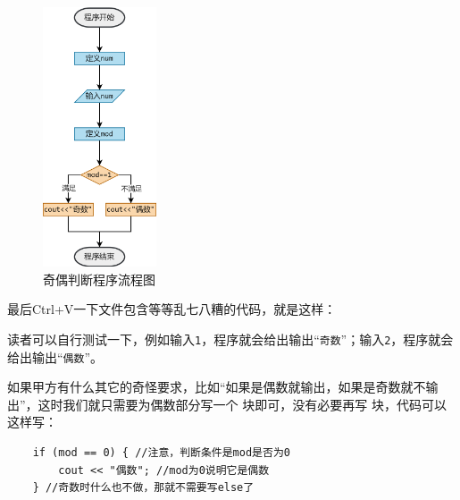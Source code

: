 \begin{figure}[htbp]
    \centering
    \includegraphics[width=0.3\textwidth]{../images/generalized_parts/03_structure_of_odd_or_even.drawio.png}
    \caption{奇偶判断程序流程图}
\end{figure}\pagebreak
最后Ctrl+V一下文件包含等等乱七八糟的代码，就是这样：

读者可以自行测试一下，例如输入\texttt{1}，程序就会给出输出``\texttt{奇数}''；输入\texttt{2}，程序就会给出输出``\texttt{偶数}''。\par
如果甲方有什么其它的奇怪要求，比如``如果是偶数就输出，如果是奇数就不输出''，这时我们就只需要为偶数部分写一个 \lstinline@if@ 块即可，没有必要再写 \lstinline@else@ 块，代码可以这样写：\pagebreak
\begin{lstlisting}
    if (mod == 0) { //注意，判断条件是mod是否为0
        cout << "偶数"; //mod为0说明它是偶数
    } //奇数时什么也不做，那就不需要写else了
\end{lstlisting}
